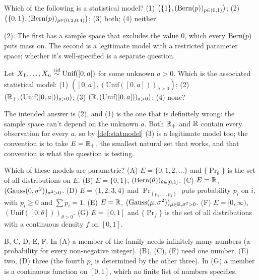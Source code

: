 \begin{exercise}
Which of the following is a statistical model? (1) $\left( \{1\}, (\text{Bern}(p))_{p \in (0,1)} \right)$; (2) $\left( \{0,1\}, (\text{Bern}(p))_{p \in (0.2, 0.4)} \right)$; (3) both; (4) neither.
\end{exercise}
\begin{solution}
(2). The first has a sample space that excludes the value $0$, which every $\text{Bern}(p)$ puts mass on. The second is a legitimate model with a restricted parameter space; whether it's well-specified is a separate question.
\end{solution}

\begin{exercise}
Let $X_1, \ldots, X_n \stackrel{iid}{\sim} \text{Unif}([0, a])$ for some unknown $a > 0$. Which is the associated statistical model: (1) $\left( [0, a], (\text{Unif}([0,a]))_{a > 0} \right)$; (2) $\left( \mathbb{R}_+, (\text{Unif}([0,a]))_{a > 0} \right)$; (3) $\left( \mathbb{R}, (\text{Unif}([0,a]))_{a > 0} \right)$; (4) none?
\end{exercise}
\begin{solution}
The intended answer is (2), and (1) is the one that is definitely wrong: the sample space can't depend on the unknown $a$. Both $\mathbb{R}_+$ and $\mathbb{R}$ contain every observation for every $a$, so by \cref{def:statmodel} (3) is a legitimate model too; the convention is to take $E = \mathbb{R}_+$, the smallest natural set that works, and that convention is what the question is testing.
\end{solution}

\begin{exercise}
Which of these models are parametric? (A) $E = \{0, 1, 2, \ldots\}$ and $\{\Pr_\theta\}$ is the set of all distributions on $E$. (B) $E = \{0,1\}$, $(\text{Bern}(\theta))_{\theta \in [0,1]}$. (C) $E = \mathbb{R}$, $(\text{Gauss}(0, \sigma^2))_{\sigma^2 > 0}$. (D) $E = \{1,2,3,4\}$ and $\Pr_{(p_1, \ldots, p_4)}$ puts probability $p_i$ on $i$, with $p_i \geq 0$ and $\sum p_i = 1$. (E) $E = \mathbb{R}$, $(\text{Gauss}(\mu, \sigma^2))_{\mu \in \mathbb{R}, \sigma^2 > 0}$. (F) $E = [0, \infty)$, $(\text{Unif}([0, \theta]))_{\theta > 0}$. (G) $E = [0,1]$ and $\{\Pr_f\}$ is the set of all distributions with a continuous density $f$ on $[0,1]$.
\end{exercise}
\begin{solution}
B, C, D, E, F. In (A) a member of the family needs infinitely many numbers (a probability for every non-negative integer). (B), (C), (F) need one number, (E) two, (D) three (the fourth $p_i$ is determined by the other three). In (G) a member is a continuous function on $[0,1]$, which no finite list of numbers specifies.
\end{solution}

